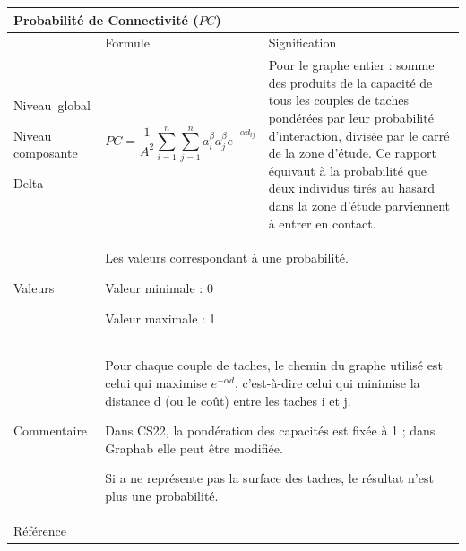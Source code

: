 \documentclass{article}
\begin{document}
\begin{table}[H]
\begin{tabular}{|m{3.24cm}|m{4.4810004cm}m{7.924cm}|}

\hline
\multicolumn{3}{|m{16.044998cm}|}{Probabilité de Connectivité ($PC$)}\\\hline
 &
\multicolumn{1}{m{4.4810004cm}|}{Formule} &
Signification\\\hline
Niveau~global

Niveau composante

Delta &
\multicolumn{1}{m{4.4810004cm}|}{\begin{equation*}
\mathit{PC}=\frac{1}{{A}^{2}}\sum _{i=1}^{n}{\sum _{j=1}^{n}{{a}_{i}^{\beta }}}{{a}_{j}^{\beta }e}^{-\alpha {d}_{\mathit{ij}}}
\end{equation*}
} &
Pour le graphe entier : somme des produits de la capacité de tous les couples de taches pondérées par leur probabilité d’interaction, divisée par le carré de la zone d’étude. Ce rapport équivaut à la probabilité que deux individus tirés au hasard dans la zone d’étude parviennent à entrer en contact.

\\\hline
Valeurs &
\multicolumn{2}{m{12.6050005cm}|}{Les valeurs correspondant à une probabilité.

Valeur minimale : 0

Valeur maximale : 1
}\\\hline
Commentaire &
\multicolumn{2}{m{12.6050005cm}|}{Pour chaque couple de taches, le chemin du graphe utilisé est celui qui maximise  ${e}^{-\mathit{\alpha d}}$, c’est-à-dire celui qui minimise la distance d (ou le coût) entre les taches i et j.

Dans CS22, la pondération des capacités est fixée à 1 ; dans Graphab elle peut être modifiée.

Si a ne représente pas la surface des taches, le résultat n’est plus une probabilité.

}\\\hline
Référence &
\multicolumn{2}{m{12.6050005cm}|}{\cite{Saura2007}}\\\hline
\end{tabular}
\end{table}
\end{document}
